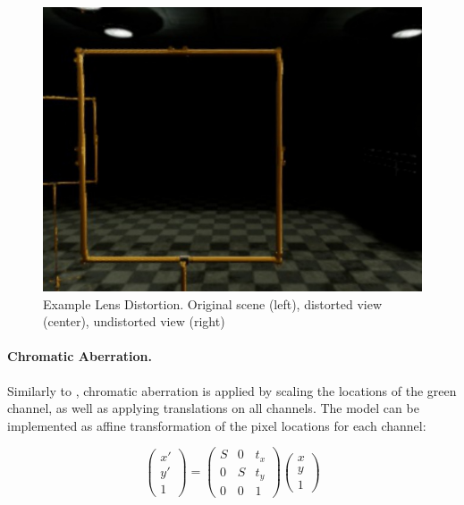 \begin{figure}[htbp]
\begin{minipage}{0.33\textwidth}
	\includegraphics[width=\textwidth]{fig/gate_example_undistorted}
\end{minipage}
\caption{Example Lens Distortion. Original scene (left), distorted view (center), undistorted view (right)}
\label{fig:distortion}
\end{figure}

\paragraph{Chromatic Aberration.}

Similarly to \cite{Carlson2018}, chromatic aberration is applied by scaling the locations of the green channel, as well as applying translations on all channels. The model can be implemented as affine transformation of the pixel locations for each channel:

\begin{equation}
\begin{pmatrix}
x' \\
y' \\
1
\end{pmatrix} = \begin{pmatrix}
S & 0 & t_x \\
0 & S & t_y \\
0 & 0 & 1
\end{pmatrix} \begin{pmatrix}
x \\
y \\
1
\end{pmatrix}
\end{equation}

